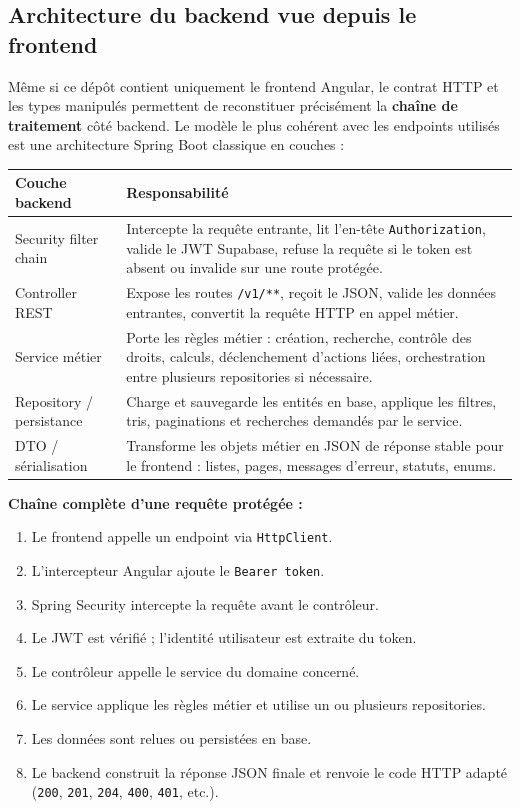 \documentclass[12pt,a4paper]{article}
\begin{document}
\subsection{Architecture du backend vue depuis le frontend}

Même si ce dépôt contient uniquement le frontend Angular, le contrat HTTP et les
types manipulés permettent de reconstituer précisément la \textbf{chaîne de traitement}
côté backend. Le modèle le plus cohérent avec les endpoints utilisés est une
architecture Spring Boot classique en couches :

\begin{center}
\begin{tabularx}{\linewidth}{L{3.2cm} X}
\toprule
\textbf{Couche backend} & \textbf{Responsabilité} \\
\midrule
Security filter chain & Intercepte la requête entrante, lit l'en-tête
\texttt{Authorization}, valide le JWT Supabase, refuse la requête si le token
est absent ou invalide sur une route protégée. \\
\midrule
Controller REST & Expose les routes \texttt{/v1/**}, reçoit le JSON, valide les
données entrantes, convertit la requête HTTP en appel métier. \\
\midrule
Service métier & Porte les règles métier : création, recherche, contrôle des
droits, calculs, déclenchement d'actions liées, orchestration entre plusieurs
repositories si nécessaire. \\
\midrule
Repository / persistance & Charge et sauvegarde les entités en base, applique les
filtres, tris, paginations et recherches demandés par le service. \\
\midrule
DTO / sérialisation & Transforme les objets métier en JSON de réponse stable pour
le frontend : listes, pages, messages d'erreur, statuts, enums. \\
\bottomrule
\end{tabularx}
\end{center}

\textbf{Chaîne complète d'une requête protégée :}
\begin{enumerate}
  \item Le frontend appelle un endpoint via \texttt{HttpClient}.
  \item L'intercepteur Angular ajoute le \texttt{Bearer token}.
  \item Spring Security intercepte la requête avant le contrôleur.
  \item Le JWT est vérifié ; l'identité utilisateur est extraite du token.
  \item Le contrôleur appelle le service du domaine concerné.
  \item Le service applique les règles métier et utilise un ou plusieurs repositories.
  \item Les données sont relues ou persistées en base.
  \item Le backend construit la réponse JSON finale et renvoie le code HTTP adapté
        (\texttt{200}, \texttt{201}, \texttt{204}, \texttt{400}, \texttt{401}, etc.).
\end{enumerate}
\end{document}
